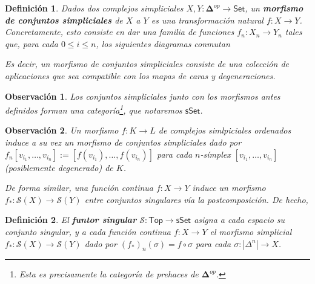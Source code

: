 \documentclass[11pt]{report}
\theoremstyle{colored}
\newtheorem{definition}{Definición}[section]
\newtheorem{remark}{Observación}[section]
\newcommand{\cat}[1]{\mathsf{#1}}
\renewcommand{\ss}[1]{\Delta^{#1}}
\newcommand{\ordcat}{\boldsymbol{\Delta}}
\begin{document}
\begin{definition} Dados dos complejos simpliciales $X,Y : \ordcat^{op} \to \cat{Set}$, un \textbf{morfismo de conjuntos simpliciales} de $X$ a $Y$ es una transformación natural $f : X \to Y$. Concretamente, esto consiste en dar una familia de funciones $f_n : X_n \to Y_n$ tales que, para cada $0 \leq i \leq n$, los siguientes diagramas conmutan
\begin{center}
\end{center}

Es decir, un morfismo de conjuntos simpliciales consiste de una colección de aplicaciones que sea compatible con los mapas de caras y degeneraciones.
\end{definition}

\begin{remark} Los conjuntos simpliciales junto con los morfismos antes definidos forman una categoría\footnote{Esta es precisamente la categoría de prehaces de $\ordcat^{op}$.}, que notaremos $\cat{sSet}$.
\end{remark}

\begin{remark} Un morfismo $f : K \to L$ de complejos simlpiciales ordenados induce a su vez un morfismo de conjuntos simpliciales dado por $f_n[v_{i_1}, \dots, v_{i_n}] := [f(v_{i_1}), \dots, f(v_{i_n})]$ para cada $n$-símplex $[v_{i_1}, \dots, v_{i_n}]$ (posiblemente degenerado) de $K$.

De forma similar, una función continua $f : X \to Y$ induce un morfismo $f_* : \mathcal{S}(X) \to \mathcal{S}(Y)$ entre conjuntos singulares vía la postcomposición. De hecho, 
\end{remark}

\begin{definition} El \textbf{funtor singular} $\mathcal{S} : \cat{Top} \to \cat{sSet}$ asigna a cada espacio su conjunto singular, y a cada función continua $f : X \to Y$ el morfismo simplicial $f_* : \mathcal{S}(X) \to \mathcal{S}(Y)$ dado por $(f_*)_n(\sigma) =  f \circ \sigma$ para cada $\sigma: |\ss{n}| \to X$.
\end{definition}
\end{document}
